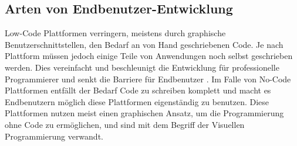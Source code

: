 %
%
%

\subsection{Arten von Endbenutzer-Entwicklung}
Low-Code Plattformen verringern, meistens durch graphische Benutzerschnittstellen, den Bedarf an von Hand geschriebenen Code. Je nach Plattform müssen jedoch einige Teile von Anwendungen noch selbst geschrieben werden. Dies vereinfacht und beschleunigt die Entwicklung für professionelle Programmierer und senkt die Barriere für Endbenutzer . Im Falle von No-Code Plattformen entfällt der Bedarf Code zu schreiben komplett und macht es Endbenutzern möglich diese Plattformen eigenständig zu benutzen. Diese Plattformen nutzen meist einen graphischen Ansatz, um die Programmierung ohne Code zu ermöglichen, und sind mit dem Begriff der Visuellen Programmierung verwandt. %

